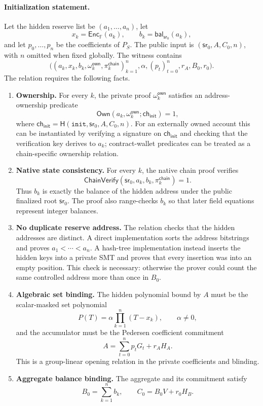 \documentclass[runningheads]{llncs}
\newcommand{\F}{\mathbb{F}}
\newcommand{\Enc}{\mathsf{Enc}}
\newcommand{\bal}{\mathsf{bal}}
\newcommand{\sr}{\mathsf{sr}}
\newcommand{\Hash}{\mathsf{H}}
\begin{document}
\paragraph{Initialization statement.}
Let the hidden reserve list be \((a_1,\ldots,a_n)\), let
\[
        x_k=\Enc_{\F}(a_k),\qquad b_k=\bal_{\sr_0}(a_k),
\]
and let \(p_0,\ldots,p_n\) be the coefficients of \(P_S\).  The public input is \((\sr_0,A,C_0,n)\), with \(n\) omitted when fixed globally.  The witness contains
\[
 \bigl((a_k,x_k,b_k,\omega_k^{\mathsf{own}},\pi_k^{\mathsf{chain}})_{k=1}^n,
        \alpha,(p_t)_{t=0}^n,r_A,B_0,r_0\bigr).
\]
The relation requires the following facts.
\begin{enumerate}[leftmargin=1.5em]
    \item \textbf{Ownership.}  For every \(k\), the private proof \(\omega_k^{\mathsf{own}}\) satisfies an address-ownership predicate
    \[
        \mathsf{Own}(a_k,\omega_k^{\mathsf{own}};\mathsf{ch}_{\mathsf{init}})=1,
    \]
    where \(\mathsf{ch}_{\mathsf{init}}=\Hash(\mathtt{init},\sr_0,A,C_0,n)\).  For an externally owned account this can be instantiated by verifying a signature on \(\mathsf{ch}_{\mathsf{init}}\) and checking that the verification key derives to \(a_k\); contract-wallet predicates can be treated as a chain-specific ownership relation.
    \item \textbf{Native state consistency.}  For every \(k\), the native chain proof verifies
    \[
        \mathsf{ChainVerify}(\sr_0,a_k,b_k,\pi_k^{\mathsf{chain}})=1 .
    \]
    Thus \(b_k\) is exactly the balance of the hidden address under the public finalized root \(\sr_0\).  The proof also range-checks \(b_k\) so that later field equations represent integer balances.
    \item \textbf{No duplicate reserve address.}  The relation checks that the hidden addresses are distinct.  A direct implementation sorts the address bitstrings and proves \(a_1<\cdots<a_n\).  A hash-tree implementation instead inserts the hidden keys into a private SMT and proves that every insertion was into an empty position.  This check is necessary: otherwise the prover could count the same controlled address more than once in \(B_0\).
    \item \textbf{Algebraic set binding.}  The hidden polynomial bound by \(A\) must be the scalar-masked set polynomial
    \[
        P(T)=\alpha\prod_{k=1}^n(T-x_k),\qquad \alpha\ne0,
    \]
    and the accumulator must be the Pedersen coefficient commitment
    \[
        A=\sum_{t=0}^np_tG_t+r_AH_A .
    \]
    This is a group-linear opening relation in the private coefficients and blinding.
    \item \textbf{Aggregate balance binding.}  The aggregate and its commitment satisfy
    \[
        B_0=\sum_{k=1}^n b_k,
        \qquad
        C_0=B_0V+r_0H_B .
    \]
\end{enumerate}
\end{document}
